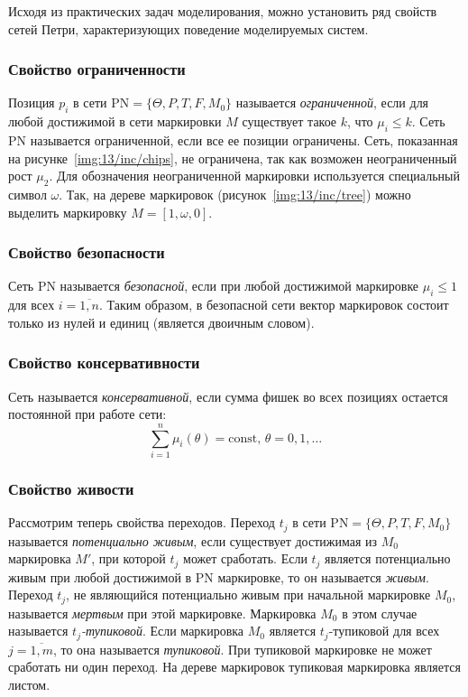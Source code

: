 Исходя из практических задач моделирования, можно установить ряд свойств сетей Петри, характеризующих поведение моделируемых систем.

\subsubsection{Свойство ограниченности}

Позиция $p_i$ в сети ${\text{PN} = \{\Theta, P, T, F, M_0\}}$ называется \textit{ограниченной}, если для любой достижимой в сети маркировки $M$ существует такое $k$, что ${\mu_i\leqslant k}$. Сеть PN называется ограниченной, если все ее позиции ограничены. Сеть, показанная на рисунке~\ref{img:13/inc/chips}, не ограничена, так как возможен неограниченный рост $\mu_2$. Для обозначения неограниченной маркировки используется специальный символ $\omega$. Так, на дереве маркировок (рисунок~\ref{img:13/inc/tree}) можно выделить маркировку ${M = [1, \omega, 0]}$.

\subsubsection{Свойство безопасности}

Сеть PN называется \textit{безопасной}, если при любой достижимой маркировке ${\mu_i\leqslant 1}$ для всех ${i = \overline{1, n}}$. Таким образом, в безопасной сети вектор маркировок состоит только из нулей и единиц (является двоичным словом).

\subsubsection{Свойство консервативности}

Сеть называется \textit{консервативной}, если сумма фишек во всех позициях остается постоянной при работе сети:
%
\begin{equation*}
    \sum\limits_{i = 1}^n\mu_i(\theta) = \text{const},\, \theta = 0, 1, \dots
\end{equation*}
%
\subsubsection{Свойство живости}

Рассмотрим теперь свойства переходов. Переход $t_j$ в сети ${\text{PN} = \{ \Theta, P, T, F, M_0 \}}$ называется \textit{потенциально живым}, если существует достижимая из $M_0$ маркировка $M'$, при которой $t_j$ может сработать. Если $t_j$ является потенциально живым при любой достижимой в PN маркировке, то он называется \textit{живым}. Переход $t_j$, не являющийся потенциально живым при начальной маркировке $M_0$, называется \textit{мертвым} при этой маркировке. Маркировка $M_0$ в этом случае называется \textit{$t_j$-тупиковой}. Если маркировка $M_0$ является $t_j$-тупиковой для всех ${j = \overline{1, m}}$, то она называется \textit{тупиковой}. При тупиковой маркировке не может сработать ни один переход. На дереве маркировок тупиковая маркировка является листом.

